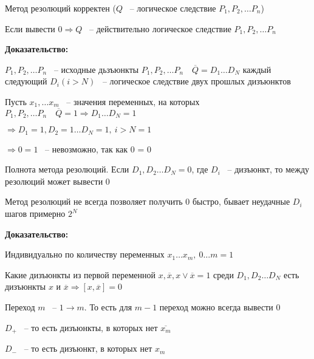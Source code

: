 \documentclass[russian]{lecture-notes}
\begin{document}
    \begin{proposition}
        Метод резолюций корректен ($Q$ ~-- логическое следствие $P_1, P_2, \dots P_n$)

        Если вывести $0 \Rightarrow Q$ ~-- действительно логическое следствие $P_1, P_2, \dots P_n$
    \end{proposition}

    \textbf{Доказательство:}

    $P_1, P_2, \dots P_n$ ~-- исходные дьзъюнкты $P_1, P_2, \dots P_n \quad \overline{Q} = D_1 \dots D_N$ каждый следующий $D_i(i > N)$ ~-- логическое следствие двух прошлых дизъюнктов

    Пусть $x_1, \dots x_m$ ~-- значения переменных, на которых $P_1, P_2, \dots P_n \quad \overline{Q} = 1 \Rightarrow D_1 \dots D_N = 1$

    $\Rightarrow D_1 = 1, D_2 = 1 \dots D_N = 1, \: i > N = 1$

    $\Rightarrow 0 = 1$ ~-- невозможно, так как 0 = 0

    \begin{proposition}
        Полнота метода резолюций. Если $D_1, D_2 \dots D_N = 0$, где $D_i$ ~-- дизъюнкт, то между резолюций может вывести 0
    \end{proposition}

    \begin{remark}
        Метод резолюций не всегда позволяет получить 0 быстро, бывает неудачные $D_i$ шагов примерно $2^N$
    \end{remark}

    \textbf{Доказательство:}

    Индивидуально по количеству переменных $x_1 \dots x_m, \: 0 \dots m = 1$

    Какие дизъюнкты из первой переменной $x, \overline{x}, x \lor \overline{x} = 1$ среди $D_1, D_2 \dots D_N$ есть дизъюнкты $x$ и $\overline{x} \Rightarrow [x, \overline{x}] = 0$

    Переход $m$ ~-- $1 \rightarrow m.$  То есть для $m - 1$ переход можно всегда вывести 0

    $D_+$ ~-- то есть дизъюнкты, в которых нет $\overline{x_m}$

    $D_-$ ~-- то есть дизъюнкт, в которых нет $x_m$
\end{document}
